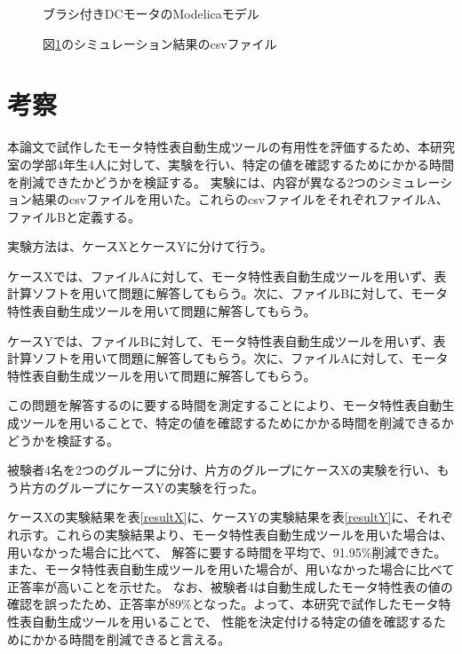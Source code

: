 \documentclass[uplatex, 10pt, a4p]{jsarticle}
\begin{document}
\begin{figure}[t]
	\centering
    \caption{ブラシ付きDCモータのModelicaモデル}
	\label{fig:tekiyou_modelica}
\end{figure}

\begin{figure}[t]
	\centering
    \caption{図\ref{fig:tekiyou_modelica}のシミュレーション結果のcsvファイル}
	\label{fig:tekiyou_csv}
\end{figure}


\section{考察}\label{sec:Evaluation}
本論文で試作したモータ特性表自動生成ツールの有用性を評価するため、本研究室の学部4年生4人に対して、実験を行い、特定の値を確認するためにかかる時間を削減できたかどうかを検証する。
実験には、内容が異なる2つのシミュレーション結果のcsvファイルを用いた。これらのcsvファイルをそれぞれファイルA、ファイルBと定義する。

実験方法は、ケースXとケースYに分けて行う。

ケースXでは、ファイルAに対して、モータ特性表自動生成ツールを用いず、表計算ソフトを用いて問題に解答してもらう。次に、ファイルBに対して、モータ特性表自動生成ツールを用いて問題に解答してもらう。

ケースYでは、ファイルBに対して、モータ特性表自動生成ツールを用いず、表計算ソフトを用いて問題に解答してもらう。次に、ファイルAに対して、モータ特性表自動生成ツールを用いて問題に解答してもらう。

この問題を解答するのに要する時間を測定することにより、モータ特性表自動生成ツールを用いることで、特定の値を確認するためにかかる時間を削減できるかどうかを検証する。

被験者4名を2つのグループに分け、片方のグループにケースXの実験を行い、もう片方のグループにケースYの実験を行った。

ケースXの実験結果を表\ref{resultX}に、ケースYの実験結果を表\ref{resultY}に、それぞれ示す。これらの実験結果より、モータ特性表自動生成ツールを用いた場合は、用いなかった場合に比べて、
解答に要する時間を平均で、91.95\%削減できた。また、モータ特性表自動生成ツールを用いた場合が、用いなかった場合に比べて正答率が高いことを示せた。
なお、被験者4は自動生成したモータ特性表の値の確認を誤ったため、正答率が89\%となった。よって、本研究で試作したモータ特性表自動生成ツールを用いることで、
性能を決定付ける特定の値を確認するためにかかる時間を削減できると言える。
\end{document}
